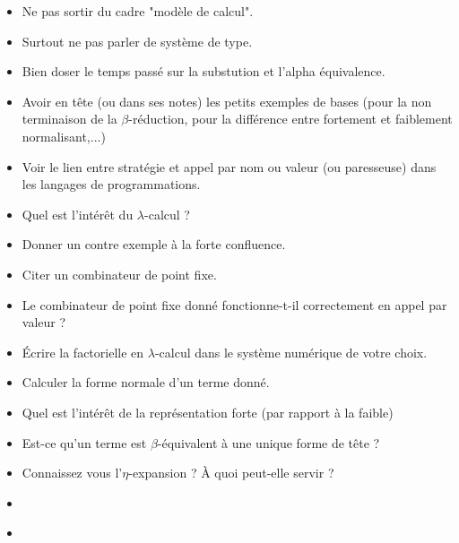 \documentclass{agregfiche}
\begin{document}
\secpieges

\begin{itemize}
    \item Ne pas sortir du cadre "modèle de calcul".
    \item Surtout ne pas parler de système de type.
    \item Bien doser le temps passé sur la substution et l'alpha 
    équivalence.
    \item Avoir en tête (ou dans ses notes) les petits exemples de 
    bases (pour la non terminaison de la $\beta$-réduction, pour la 
    différence entre fortement et faiblement normalisant,...)
    \item Voir le lien entre stratégie et appel par nom ou valeur (ou 
    paresseuse)
    dans les langages de programmations.
    

\end{itemize}

\secquestionsclassiques

\begin{itemize}
    \item Quel est l'intérêt du $\lambda$-calcul ?
    \item Donner un contre exemple à la forte confluence.
    \item Citer un combinateur de point fixe.
    \item Le combinateur de point fixe donné 
        fonctionne-t-il correctement en appel 
        par valeur ?
    \item Écrire la factorielle en $\lambda$-calcul 
        dans le système numérique de votre choix.
    \item Calculer la forme normale d'un terme donné.
    \item Quel est l'intérêt de la représentation forte (par rapport à la faible)
    \item Est-ce qu'un terme est $\beta$-équivalent à une unique forme de tête ?
    \item Connaissez vous l'$\eta$-expansion ? À quoi peut-elle servir ?
\end{itemize}

\secreferences

\begin{itemize}
    \item 
\end{itemize}


\secdev

\begin{itemize}
    \item 

\end{itemize}
\end{document}
